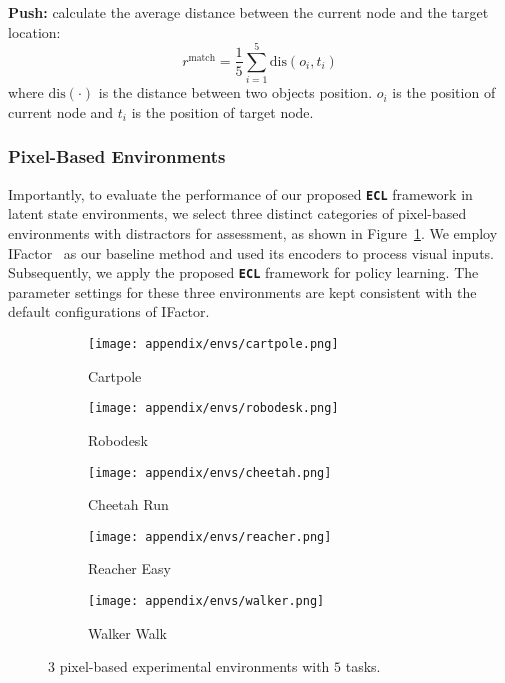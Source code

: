 \textbf{Push:} calculate the average distance between the current node and the target location:
\begin{equation}
 r^{\mathrm{match}}= \frac{1}{5} \sum_{i=1}^{5} \mathrm{dis}(o_i, t_i)
\end{equation}
where $\mathrm{dis(\cdot)}$ is the distance between two objects position. $o_i$ is the position of current node and $t_i$ is the position of target node. 

\subsubsection{Pixel-Based Environments}
Importantly, to evaluate the performance of our proposed \texttt{\textbf{ECL}} framework in latent state environments, we select three distinct categories of pixel-based environments with distractors for assessment, as shown in Figure~\ref{fig:abl_envs_pixed}. We employ IFactor~\citep{liu2024learning} as our baseline method and used its encoders to process visual inputs. Subsequently, we apply the proposed \texttt{\textbf{ECL}} framework for policy learning. The parameter settings for these three environments are kept consistent with the default configurations of IFactor. 

\begin{figure}[h]
\centering
\begin{subfigure}{0.19\linewidth}
\texttt{[image: appendix/envs/cartpole.png]}
\caption{Cartpole}
\end{subfigure}
\hfill
\begin{subfigure}{0.19\linewidth}
\texttt{[image: appendix/envs/robodesk.png]}
\caption{Robodesk}
\end{subfigure}
\hfill
\begin{subfigure}{0.19\linewidth}
\texttt{[image: appendix/envs/cheetah.png]}
\caption{Cheetah Run}
\end{subfigure}
\hfill
\begin{subfigure}{0.19\linewidth}
\texttt{[image: appendix/envs/reacher.png]}
\caption{Reacher Easy}
\end{subfigure}
\hfill
\begin{subfigure}{0.19\linewidth}
\texttt{[image: appendix/envs/walker.png]}
\caption{Walker Walk}
\end{subfigure}
\hfill
\caption{3 pixel-based experimental environments with $5$ tasks.}
\label{fig:abl_envs_pixed}
\end{figure}


